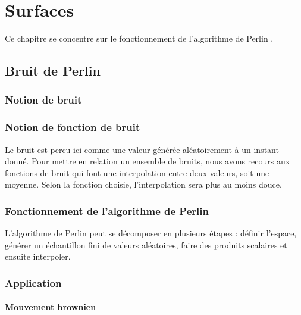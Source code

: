 \chapter{Surfaces}

Ce chapitre se concentre sur le fonctionnement de l'algorithme de Perlin \cite{PerlinNoise}.

\section{Bruit de Perlin}

\subsection{Notion de bruit}

\subsection{Notion de fonction de bruit}

Le bruit est percu ici comme une valeur générée aléatoirement à un instant donné. 
Pour mettre en relation un ensemble de bruits, nous avons recours aux fonctions de bruit qui font une interpolation entre deux valeurs, soit une moyenne. 
Selon la fonction choisie, l'interpolation sera plus au moins douce.

\subsection{Fonctionnement de l'algorithme de Perlin} 

L'algorithme de Perlin peut se décomposer en plusieurs étapes : définir l'espace, générer un échantillon fini de valeurs aléatoires, faire des produits scalaires et ensuite interpoler. 



\subsection{Application}

\subsubsection{Mouvement brownien}



